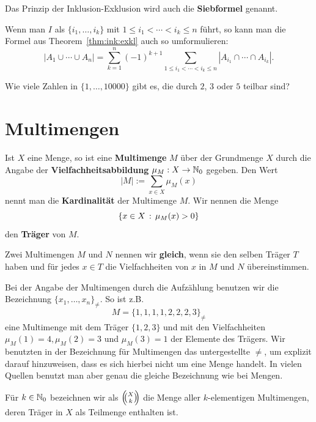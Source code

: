 \begin{bem}
	Das Prinzip der Inklusion-Exklusion wird auch die \textbf{Siebformel} genannt. 
\end{bem} 

\begin{bem}
	Wenn man $I$ als $\{i_1,\ldots,i_k\}$ mit $1 \le i_1 < \cdots < i_k \le n$ führt, so kann man die Formel aus Theorem~\ref{thm:ink:exkl} auch so umformulieren: 
	\[
		|A_1 \cup \cdots \cup A_n| = \sum_{k=1}^n (-1)^{k+1} \sum_{1 \le i_1 < \cdots < i_k \le n} | A_{i_1} \cap \cdots \cap A_{i_k}|. 
	\]
\end{bem} 

\begin{aufg}
	Wie viele Zahlen in $\{1,\ldots,10000\}$ gibt es, die durch $2$, $3$ oder $5$ teilbar sind? 
\end{aufg} 

\section{Multimengen} 

\begin{defn}
Ist $X$ eine Menge, so ist eine \textbf{Multimenge} $M$ über der Grundmenge $X$ durch die Angabe der \textbf{Vielfachheitsabbildung} $\mu_M : X \to \mathbb{N}_0$ gegeben. Den Wert 
\[
	|M|:=\sum_{x \in X} \mu_M(x)
\]
nennt man die \textbf{Kardinalität} der Multimenge $M$.  Wir nennen die Menge 
\[
	\left\{  x \in X \,:\, \mu_M(x)>0 \right\}
\]
den \textbf{Träger} von $M$.

Zwei Multimengen $M$ und $N$ nennen wir \textbf{gleich}, wenn sie den selben Träger $T$ haben und für jedes $x \in T$ die Vielfachheiten von $x$ in $M$ und $N$ übereinstimmen.
\end{defn} 

\begin{bem}
	Bei der Angabe der Multimengen durch die Aufzählung benutzen wir die Bezeichnung $\{x_1,\ldots,x_n\}_{\ne}$. So ist z.B. 
	\[
			M = \{1,1,1,1,2,2,2,3\}_{\ne}
	\]
	eine Multimenge mit dem Träger $\{1,2,3\}$ und mit den Vielfachheiten $\mu_M(1) =4, \mu_M(2)=3$ und $\mu_M(3)=1$ der Elemente des Trägers. Wir benutzten in der Bezeichnung für Multimengen das untergestellte $\ne$, um explizit darauf hinzuweisen, dass es sich hierbei nicht um eine Menge handelt. In vielen Quellen benutzt man aber genau die gleiche Bezeichnung wie bei Mengen. 
\end{bem}

\begin{defn}
	Für $k \in \mathbb{N}_0$ bezeichnen wir als $\left(\!\!\binom{X}{k}\!\!\right)$ die Menge aller $k$-elementigen Multimengen, deren Träger in  $X$ als Teilmenge enthalten ist. 
\end{defn} 

